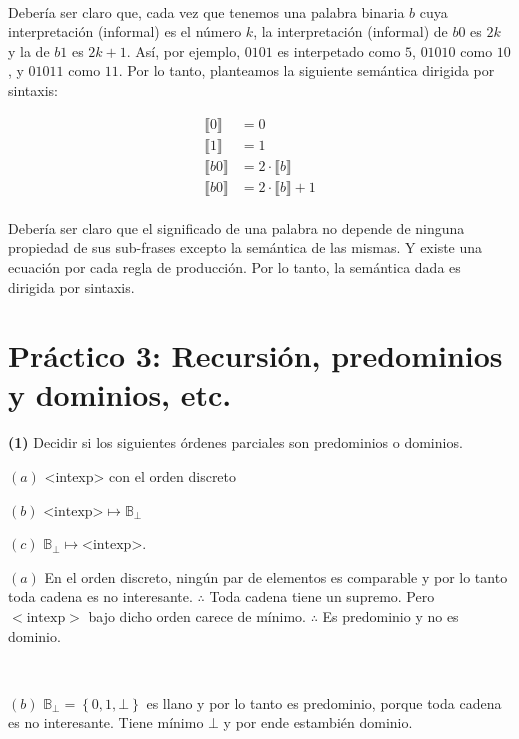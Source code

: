 \documentclass[article, 12pt]{article}
\begin{document}
~

Debería ser claro que, cada vez que tenemos una palabra binaria $b$ cuya
interpretación (informal) es el número $k$, la interpretación (informal) de 
$b0$ es $2k$ y la de $b1$ es $2k+1$. Así, por ejemplo, $0101$ es interpetado
como $5$, $01010$ como $10$, y $01011$ como $11$. Por lo tanto, planteamos la
siguiente semántica dirigida por sintaxis:

\begin{align*}
  \llbracket 0 \rrbracket &= 0 \\ 
  \llbracket 1 \rrbracket &= 1 \\ 
  \llbracket b0 \rrbracket &= 2 \cdot \llbracket b \rrbracket\\
  \llbracket b0 \rrbracket &= 2 \cdot \llbracket b \rrbracket + 1\\
\end{align*}

Debería ser claro que el significado de una palabra no depende de ninguna
propiedad de sus sub-frases excepto la semántica de las mismas. Y existe una
ecuación por cada regla de producción. Por lo tanto, la semántica dada es
dirigida por sintaxis.


\pagebreak
\section{Práctico 3: Recursión, predominios y dominios, etc.}


\begin{myframe}
\textbf{(1)} Decidir si los siguientes órdenes parciales son predominios o
dominios.

$(a)$ <intexp> con el orden discreto

$(b)$ $\text{<intexp>} \mapsto
\mathbb{B}_{\bot}$

$(c)$ $\mathbb{B}_\bot \mapsto \text{<intexp>}$.
\end{myframe}

$(a)$ En el orden discreto, ningún par de elementos es comparable y por lo tanto
toda cadena es no interesante. $\therefore $ Toda cadena tiene un supremo. Pero
$<\text{intexp}>$ bajo dicho orden carece de mínimo. $\therefore $ Es
predominio y no es dominio.

~


$(b)$ $\mathbb{B}_\bot = \left\{ 0,1, \bot  \right\} $ es llano y por lo tanto
es predominio, porque toda cadena es no interesante. Tiene mínimo $\bot$ y por
ende estambién dominio.

~
\end{document}
